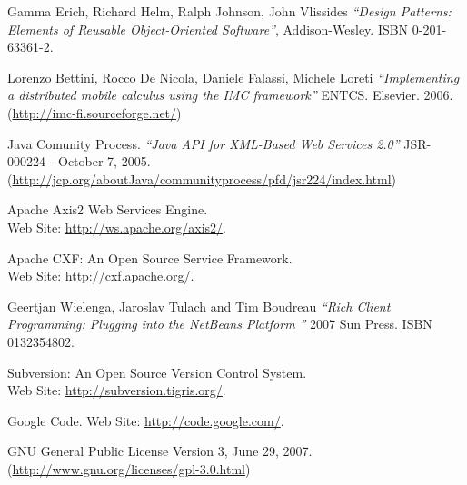 \begin{thebibliography}{99}
 Gamma Erich, Richard Helm, Ralph Johnson, John Vlissides
\emph{``Design Patterns: Elements of Reusable Object-Oriented Software''},
Addison-Wesley. ISBN 0-201-63361-2.

 Lorenzo Bettini, Rocco De Nicola, Daniele Falassi, Michele Loreti
\emph{``Implementing a distributed mobile calculus using the IMC framework''}
ENTCS. Elsevier. 2006.\\
(\href{http://imc-fi.sourceforge.net/}{http://imc-fi.sourceforge.net/})

 Java Comunity Process. \emph{``Java API for XML-Based Web
Services 2.0''} JSR-000224 - October 7, 2005.\\
(\href{http://jcp.org/aboutJava/communityprocess/pfd/jsr224/index.html}{http://jcp.org/aboutJava/communityprocess/pfd/jsr224/index.html})

 Apache Axis2 Web Services Engine. \\
Web Site: \href{http://ws.apache.org/axis2/}{http://ws.apache.org/axis2/}.

 Apache CXF: An Open Source Service Framework. \\
Web Site: \href{http://cxf.apache.org/}{http://cxf.apache.org/}.

 Geertjan Wielenga, Jaroslav Tulach and Tim Boudreau
\emph{``Rich Client Programming: Plugging into the NetBeans Platform ''} 2007
Sun Press. ISBN 0132354802.

 Subversion: An Open Source Version Control System. \\
Web Site: \href{http://subversion.tigris.org/}{http://subversion.tigris.org/}.

 Google Code. Web
Site: \href{http://code.google.com/}{http://code.google.com/}.

 GNU General Public License Version 3, June 29, 2007. \\ 
(\href{http://www.gnu.org/licenses/gpl-3.0.html}{http://www.gnu.org/licenses/gpl-3.0.html})

\end{thebibliography} 